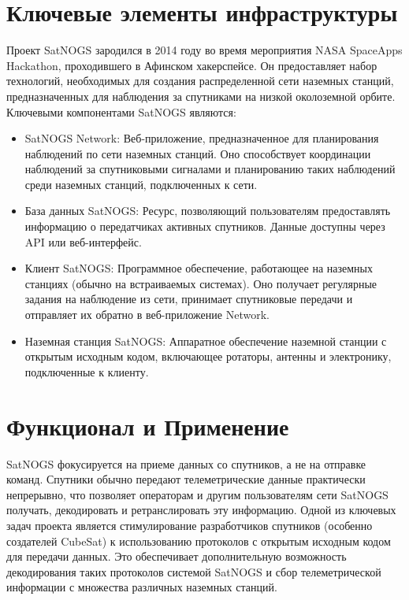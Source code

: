 \documentclass[14pt, a4paper]{../cls/coursework}
\begin{document}
    \section{Ключевые элементы инфраструктуры}

    Проект SatNOGS зародился в 2014 году во время мероприятия NASA SpaceApps Hackathon, проходившего в Афинском хакерспейсе.
    Он предоставляет набор технологий, необходимых для создания распределенной сети наземных станций, предназначенных для наблюдения за спутниками на низкой околоземной орбите.
    Ключевыми компонентами SatNOGS являются:

    \begin{itemize}[label=\textbullet]
        \item    SatNOGS Network: Веб-приложение, предназначенное для планирования наблюдений по сети наземных станций.
        Оно способствует координации наблюдений за спутниковыми сигналами и планированию таких наблюдений среди наземных станций, подключенных к сети.
        \item    База данных SatNOGS: Ресурс, позволяющий пользователям предоставлять информацию о передатчиках активных спутников.
        Данные доступны через API или веб-интерфейс.
        \item    Клиент SatNOGS: Программное обеспечение, работающее на наземных станциях (обычно на встраиваемых системах).
        Оно получает регулярные задания на наблюдение из сети, принимает спутниковые передачи и отправляет их обратно в веб-приложение Network.
        \item    Наземная станция SatNOGS: Аппаратное обеспечение наземной станции с открытым исходным кодом, включающее ротаторы, антенны и электронику, подключенные к клиенту.
    \end{itemize}

    \section{Функционал и Применение}

    SatNOGS фокусируется на приеме данных со спутников, а не на отправке команд.
    Спутники обычно передают телеметрические данные практически непрерывно, что позволяет операторам и другим пользователям сети SatNOGS получать, декодировать и ретранслировать эту информацию.
    Одной из ключевых задач проекта является стимулирование разработчиков спутников (особенно создателей CubeSat) к использованию протоколов с открытым исходным кодом для передачи данных.
    Это обеспечивает дополнительную возможность декодирования таких протоколов системой SatNOGS и сбор телеметрической информации с множества различных наземных станций.
\end{document}
